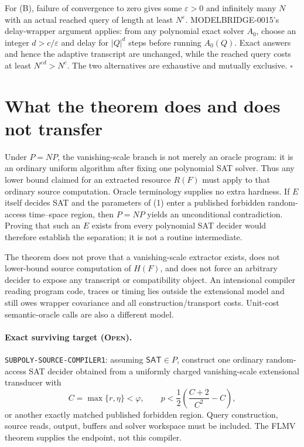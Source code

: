 \documentclass[11pt]{article}
\newcommand{\SAT}{\mathsf{SAT}}
\newcommand{\status}[1]{\textsc{#1}}
\begin{document}
For (B), failure of convergence to zero gives some $\varepsilon>0$ and
infinitely many $N$ with an actual reached query of length at least
$N^\varepsilon$.  MODELBRIDGE-0015's delay-wrapper argument applies: from any
polynomial exact solver $A_0$, choose an integer $d>c/\varepsilon$ and delay
for $|Q|^d$ steps before running $A_0(Q)$.  Exact answers and hence the
adaptive transcript are unchanged, while the reached query costs at least
$N^{\varepsilon d}>N^c$.  The two alternatives are exhaustive and mutually
exclusive. \hfill$\square$

\section{What the theorem does and does not transfer}

Under $P=NP$, the vanishing-scale branch is not merely an oracle program: it
is an ordinary uniform algorithm after fixing one polynomial SAT solver.
Thus any lower bound claimed for an extracted resource $R(F)$ must apply to
that ordinary source computation.  Oracle terminology supplies no extra
hardness.  If $E$ itself decides SAT and the parameters of (1) enter a
published forbidden random-access time--space region, then $P=NP$ yields an
unconditional contradiction.  Proving that such an $E$ exists from every
polynomial SAT decider would therefore establish the separation; it is not a
routine intermediate.

The theorem does not prove that a vanishing-scale extractor exists, does not
lower-bound source computation of $H(F)$, and does not force an arbitrary
decider to expose any transcript or compatibility object.  An intensional
compiler reading program code, traces or timing lies outside the extensional
model and still owes wrapper covariance and all construction/transport costs.
Unit-cost semantic-oracle calls are also a different model.

\paragraph{Exact surviving target (\status{Open}).}
\texttt{SUBPOLY-SOURCE-COMPILER1}: assuming $\SAT\in P$, construct one
ordinary random-access SAT decider obtained from a uniformly charged
vanishing-scale extensional transducer with
\[
 C=\max\{r,\eta\}<\varphi,
 \qquad
 p<\frac12\left(\frac{C+2}{C^2}-C\right),
\]
or another exactly matched published forbidden region.  Query construction,
source reads, output, buffers and solver workspace must be included.  The
FLMV theorem supplies the endpoint, not this compiler.
\end{document}
